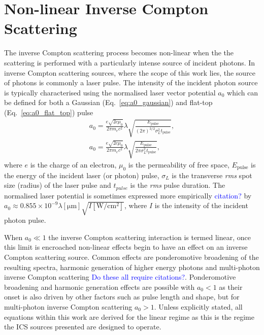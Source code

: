 \documentclass[../main.tex]{subfiles}
\begin{document}
\section{Non-linear Inverse Compton Scattering}

The inverse Compton scattering process becomes non-linear when the the scattering is performed with a particularly intense source of incident photons. In inverse Compton scattering sources, where the scope of this work lies, the source of photons is commonly a laser pulse. The intensity of the incident photon source is typically characterised using the normalised laser vector potential $a_{0}$ which can be defined for both a Gaussian (Eq.~\ref{eq:a0_gaussian}) and flat-top (Eq.~\ref{eq:a0_flat_top}) pulse \cite{terzic2019improving}
\begin{gather}
a_{0} = \frac{e\sqrt{2c\mu_{0}}}{2\pi m_{e}c^{2}}\lambda\sqrt{\frac{E_{\mathrm{pulse}}}{\left(2\pi\right)^{3/2}\sigma_{L}^{2}t_{\mathrm{pulse}}}},
\label{eq:a0_gaussian} \\
a_{0} = \frac{e\sqrt{2c\mu_{0}}}{2\pi m_{e}c^{2}}\lambda\sqrt{\frac{E_{\mathrm{pulse}}}{2\pi\sigma_{L}^{2}t_{\mathrm{pulse}}}},
\label{eq:a0_flat_top}
\end{gather}
where $e$ is the charge of an electron, $\mu_{0}$ is the permeability of free space, $E_{\mathrm{pulse}}$ is the energy of the incident laser (or photon) pulse, $\sigma_{L}$ is the transverse \textit{rms} spot size (radius) of the laser pulse and $t_{pulse}$ is the \textit{rms} pulse duration. The normalised laser potential is sometimes expressed more empirically \textcolor{blue}{citation?} by $a_{0} \approx 0.855\times 10^{-9} \lambda\left[\mathrm{\mu m}\right]\sqrt{I\left[\mathrm{W/cm^{2}}\right]}$, where $I$ is the intensity of the incident photon pulse.

When $a_{0} \ll 1$ the inverse Compton scattering interaction is termed linear, once this limit is encroached non-linear effects begin to have an effect on an inverse Compton scattering source. Common effects are ponderomotive broadening of the resulting spectra, harmonic generation of higher energy photons and multi-photon inverse Compton scattering \textcolor{blue}{Do these all require citations?}. Ponderomotive broadening and harmonic generation effects are possible with $a_{0}<1$ as their onset is also driven by other factors such as pulse length and shape, but for multi-photon inverse Compton scattering $a_{0}>1$. Unless explicitly stated, all equations within this work are derived for the linear regime as this is the regime the ICS sources presented are designed to operate.
\end{document}
